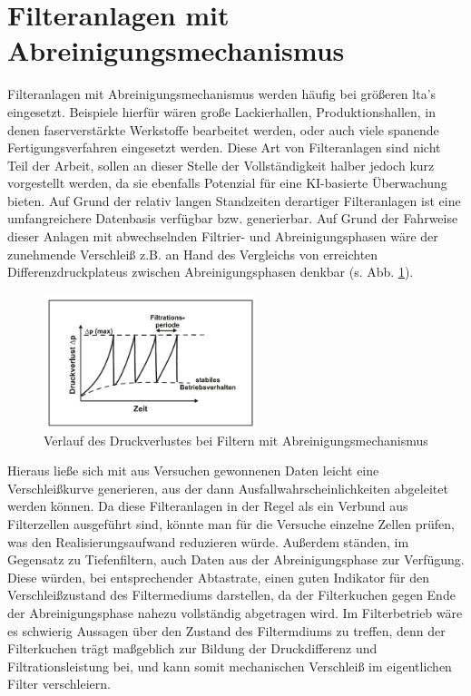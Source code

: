 \section{Filteranlagen mit Abreinigungsmechanismus}
Filteranlagen mit Abreinigungsmechanismus werden häufig bei größeren \ac{lta}'s eingesetzt. Beispiele hierfür wären große Lackierhallen, Produktionshallen, in denen faserverstärkte Werkstoffe bearbeitet werden, oder auch viele spanende Fertigungsverfahren eingesetzt werden. Diese Art von Filteranlagen sind nicht Teil der Arbeit, sollen an dieser Stelle der Vollständigkeit halber jedoch kurz vorgestellt werden, da sie ebenfalls Potenzial für eine KI-basierte Überwachung bieten. \newline
Auf Grund der relativ langen Standzeiten derartiger Filteranlagen ist eine umfangreichere Datenbasis verfügbar bzw. generierbar.
Auf Grund der Fahrweise dieser Anlagen mit abwechselnden Filtrier- und Abreinigungsphasen wäre der zunehmende Verschleiß z.B. an Hand des Vergleichs von erreichten Differenzdruckplateus zwischen Abreinigungsphasen denkbar (s. Abb. \ref{fi:druckverlust_abr}). 
\begin{figure}[H]
    \begin{center}
        \includegraphics[width=0.55\textwidth]{images/druckverlust_wechsel.png}
        \caption[Druckverlust abreinigende Filter]{Verlauf des Druckverlustes bei Filtern mit Abreinigungsmechanismus \cite{immission} }
        \label{fi:druckverlust_abr}
    \end{center}
\end{figure}
Hieraus ließe sich mit aus Versuchen gewonnenen Daten leicht eine Verschleißkurve generieren, aus der dann Ausfallwahrscheinlichkeiten abgeleitet werden können. Da diese Filteranlagen in der Regel als ein Verbund aus Filterzellen ausgeführt sind, könnte man für die Versuche einzelne Zellen prüfen, was den Realisierungsaufwand reduzieren würde.
Außerdem ständen, im Gegensatz zu Tiefenfiltern, auch Daten aus der Abreinigungsphase zur Verfügung. Diese würden, bei entsprechender Abtastrate, einen guten Indikator für den Verschleißzustand des Filtermediums darstellen, da der Filterkuchen gegen Ende der Abreinigungsphase nahezu vollständig abgetragen wird. Im Filterbetrieb wäre es schwierig Aussagen über den Zustand des Filtermdiums zu treffen, denn der Filterkuchen trägt maßgeblich zur Bildung der Druckdifferenz und Filtrationsleistung bei, und kann somit mechanischen Verschleiß im eigentlichen Filter verschleiern.
